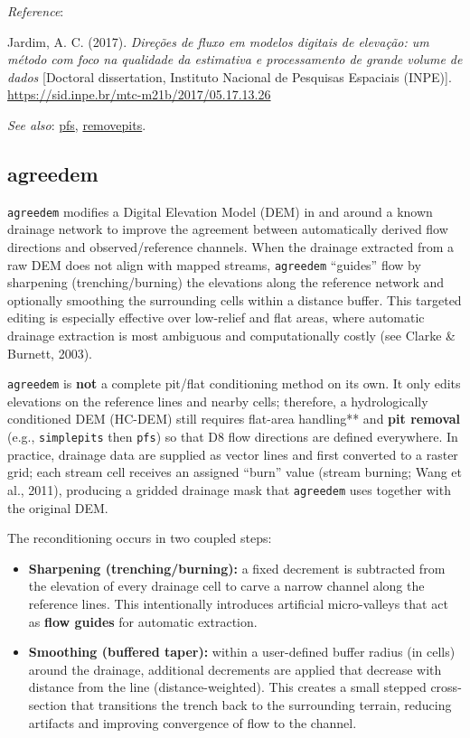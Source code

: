 \documentclass[
]{book}
\providecommand{\tightlist}{%
  \setlength{\itemsep}{0pt}\setlength{\parskip}{0pt}}
\begin{document}
\emph{Reference}:

Jardim, A. C. (2017). \emph{Direções de fluxo em modelos digitais de elevação: um método com foco na qualidade da estimativa e processamento de grande volume de dados} {[}Doctoral dissertation, Instituto Nacional de Pesquisas Espaciais (INPE){]}. \href{http://mtc-m21b.sid.inpe.br/col/sid.inpe.br/mtc-m21b/2017/05.17.13.26/doc/publicacao.pdf?metadatarepository=sid.inpe.br/mtc-m21b/2017/05.17.13.26.57&mirror=sid.inpe.br/mtc-m21b/2013/09.26.14.25.22&languagebutton=en}{https://sid.inpe.br/mtc-m21b/2017/05.17.13.26}

\emph{See also}: \hyperref[pfs]{pfs}, \hyperref[removepits]{removepits}.

\subsection{agreedem}\label{agreedem}

\texttt{agreedem} modifies a Digital Elevation Model (DEM) in and around a known drainage network to improve the agreement between automatically derived flow directions and observed/reference channels. When the drainage extracted from a raw DEM does not align with mapped streams, \texttt{agreedem} ``guides'' flow by sharpening (trenching/burning) the elevations along the reference network and optionally smoothing the surrounding cells within a distance buffer. This targeted editing is especially effective over low-relief and flat areas, where automatic drainage extraction is most ambiguous and computationally costly (see Clarke \& Burnett, 2003).

\texttt{agreedem} is \textbf{not} a complete pit/flat conditioning method on its own. It only edits elevations on the reference lines and nearby cells; therefore, a hydrologically conditioned DEM (HC-DEM) still requires flat-area handling** and \textbf{pit removal} (e.g., \texttt{simplepits} then \texttt{pfs}) so that D8 flow directions are defined everywhere. In practice, drainage data are supplied as vector lines and first converted to a raster grid; each stream cell receives an assigned ``burn'' value (stream burning; Wang et al., 2011), producing a gridded drainage mask that \texttt{agreedem} uses together with the original DEM.

The reconditioning occurs in two coupled steps:

\begin{itemize}
\tightlist
\item
  \textbf{Sharpening (trenching/burning):} a fixed decrement is subtracted from the elevation of every drainage cell to carve a narrow channel along the reference lines. This intentionally introduces artificial micro-valleys that act as \textbf{flow guides} for automatic extraction.
\item
  \textbf{Smoothing (buffered taper):} within a user-defined buffer radius (in cells) around the drainage, additional decrements are applied that decrease with distance from the line (distance-weighted). This creates a small stepped cross-section that transitions the trench back to the surrounding terrain, reducing artifacts and improving convergence of flow to the channel.
\end{itemize}
\end{document}
